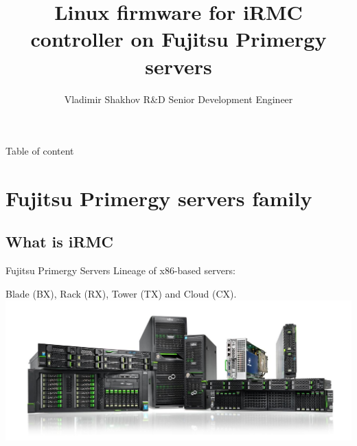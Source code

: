 \documentclass{beamer}
\author[Author, Vladimir Shakhov]{Vladimir Shakhov \newline R\&D Senior Development Engineer }
\institute[Fujitsu Technology Solutions]
{
  Fujitsu Technology Solutions, R\&D department
}
\date[\now]
\title{Linux firmware for iRMC controller on Fujitsu Primergy servers}
\begin{document}

\begin{frame} 
  \titlepage 
\end{frame} 

\usebackgroundtemplate{} %

\begin{frame}{Table of content}
  \tableofcontents
\end{frame}


\section{Fujitsu Primergy servers family}
	
  \subsection{What is iRMC}
  
  \begin{frame}{Fujitsu Primergy Servers}
	Lineage of x86-based servers: 
	
	Blade (BX), Rack (RX), Tower (TX) and Cloud (CX).
	\includegraphics[scale=0.23]{primergy-servers.png}
  \end{frame}
\end{document}

